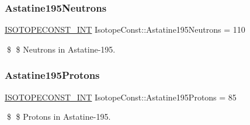 \subsubsection{\texorpdfstring{Astatine195\+Neutrons}{Astatine195Neutrons}}
{\footnotesize\ttfamily \mbox{\hyperlink{group___isotope_const-_macros_ga5f18360b3e99483a35c32d789e62621c}{I\+S\+O\+T\+O\+P\+E\+C\+O\+N\+S\+T\+\_\+\+I\+NT}} Isotope\+Const\+::\+Astatine195\+Neutrons = 110}

\$ \$ Neutrons in Astatine-\/195. \mbox{\label{group___isotope_const-_astatine-_at195_gadab401799dad749adab92abd47c47265}} 
\subsubsection{\texorpdfstring{Astatine195\+Protons}{Astatine195Protons}}
{\footnotesize\ttfamily \mbox{\hyperlink{group___isotope_const-_macros_ga5f18360b3e99483a35c32d789e62621c}{I\+S\+O\+T\+O\+P\+E\+C\+O\+N\+S\+T\+\_\+\+I\+NT}} Isotope\+Const\+::\+Astatine195\+Protons = 85}

\$ \$ Protons in Astatine-\/195. 